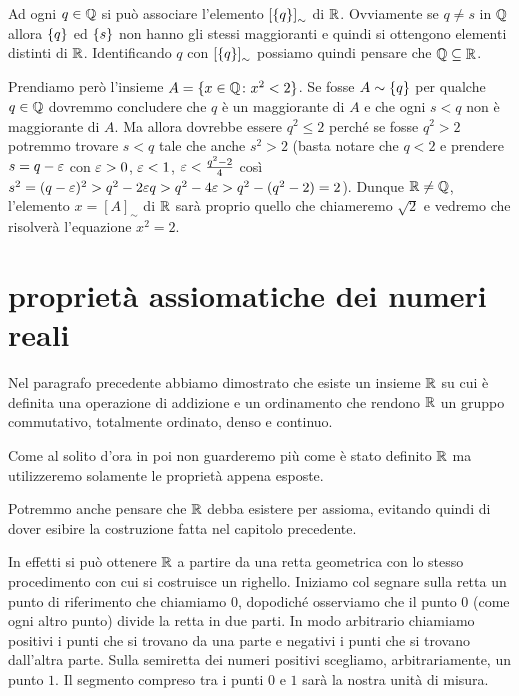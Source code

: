 Ad ogni $q\in {\mathbb Q}$ si può associare l'elemento ${\left[ {\left\{ q \right\}} \right]}_\sim$ 
di ${\mathbb R}$. Ovviamente se $q\neq s$ in ${\mathbb Q}$ allora ${\left\{ q \right\}}$ 
ed ${\left\{ s \right\}}$ non hanno gli stessi maggioranti e quindi si ottengono 
elementi distinti di ${\mathbb R}$. Identificando $q$ con ${\left[ {\left\{ q \right\}} \right]}_\sim$ 
possiamo quindi pensare che ${\mathbb Q} \subseteq {\mathbb R}$.

Prendiamo però l'insieme $A=\{x\in {\mathbb Q}\colon x^2<2\}$.
Se fosse $A\sim {\left\{ q \right\}}$ per qualche $q\in {\mathbb Q}$ dovremmo 
concludere che $q$ è un maggiorante di $A$ e che ogni $s<q$ 
non è maggiorante di $A$. 
Ma allora dovrebbe essere $q^2\le 2$ perché se fosse $q^2>2$
potremmo trovare $s<q$ tale che anche $s^2>2$ 
(basta notare che $q<2$ e prendere $s=q-\varepsilon$ con $\varepsilon>0$, $\varepsilon<1$, 
$\varepsilon<\frac{q^2-2}{4}$ così $s^2=(q-\varepsilon)^2 > q^2-2\varepsilon q > q^2-4\varepsilon
> q^2-(q^2-2) = 2$).
Dunque ${\mathbb R}\neq {\mathbb Q}$, l'elemento $x=[A]_\sim$ di ${\mathbb R}$ sarà 
proprio quello che chiameremo $\sqrt 2$ e vedremo che 
risolverà l'equazione $x^2=2$. 

\section{proprietà assiomatiche dei numeri reali}
\label{sec:reali}

Nel paragrafo precedente abbiamo dimostrato che esiste un insieme 
${\mathbb R}$ su cui è definita una operazione di addizione
e un ordinamento che rendono ${\mathbb R}$ un gruppo commutativo, totalmente ordinato,
denso e continuo. 

Come al solito d'ora in poi non guarderemo più come è stato definito ${\mathbb R}$ 
ma utilizzeremo solamente le proprietà appena esposte. 

Potremmo anche pensare che ${\mathbb R}$ debba esistere per assioma, 
evitando quindi di dover esibire la costruzione fatta nel capitolo precedente.

In effetti si può ottenere ${\mathbb R}$ a partire da una retta geometrica 
con lo stesso procedimento con cui si costruisce un righello.
Iniziamo col segnare
sulla retta un punto di riferimento che chiamiamo $0$, 
dopodiché osserviamo che
il punto $0$ (come ogni altro punto) divide la retta in due parti. In modo arbitrario
chiamiamo positivi i punti che si trovano da una parte e negativi i punti che
si trovano dall'altra parte. Sulla semiretta dei numeri positivi scegliamo, arbitrariamente,
un punto $1$. Il segmento compreso tra i punti $0$ e $1$ sarà la nostra unità di
misura.

